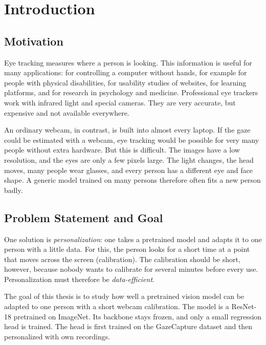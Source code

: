 \chapter{Introduction}
\label{ch:einleitung}

\section{Motivation}
\label{sec:motivation}
Eye tracking measures where a person is looking. This information is useful for
many applications: for controlling a computer without hands, for example for
people with physical disabilities, for usability studies of websites, for
learning platforms, and for research in psychology and medicine. Professional
eye trackers work with infrared light and special cameras. They are very
accurate, but expensive and not available everywhere.

An ordinary webcam, in contrast, is built into almost every laptop. If the gaze
could be estimated with a webcam, eye tracking would be possible for very many
people without extra hardware. But this is difficult. The images have a low
resolution, and the eyes are only a few pixels large. The light changes, the
head moves, many people wear glasses, and every person has a different eye and
face shape. A generic model trained on many persons therefore often fits a new
person badly.

\section{Problem Statement and Goal}
\label{sec:ziel}
One solution is \emph{personalization}: one takes a pretrained model and adapts
it to one person with a little data. For this, the person looks for a short time
at a point that moves across the screen (calibration). The calibration should be
short, however, because nobody wants to calibrate for several minutes before
every use. Personalization must therefore be \emph{data-efficient}.

The goal of this thesis is to study how well a pretrained vision model can be
adapted to one person with a short webcam calibration. The model is a ResNet-18
pretrained on ImageNet. Its backbone stays frozen, and only a small regression
head is trained. The head is first trained on the GazeCapture dataset and then
personalized with own recordings.

